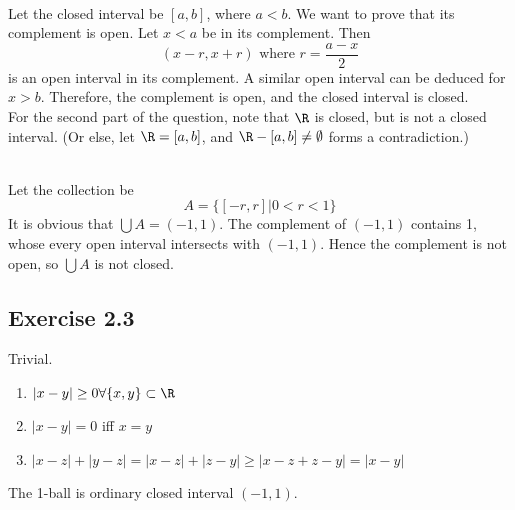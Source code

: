 
\begin{solution}
 \\Let the closed interval be $[a,b]$, where $a < b$. We want to prove that its complement is open. Let $x < a$ be in its complement. Then
 $$(x-r,x+r) \text{ where } r = \frac{a-x}{2}$$
 is an open interval in its complement. A similar open interval can be deduced for $x > b$. Therefore, the complement is open, and the closed interval is closed. \\
 For the second part of the question, note that $\R$ is closed, but is not a closed interval. (Or else, let $\R = [a,b]$, and $\R-[a,b] \neq \emptyset$ forms a contradiction.)
\end{solution}


\begin{solution}
 \\Let the collection be
 $$A = \{[-r,r]|0<r<1\}$$
 It is obvious that $\bigcup A = (-1,1)$. The complement of $(-1,1)$ contains 1, whose every open interval intersects with $(-1,1)$. Hence the complement is not open, so $\bigcup A$ is not closed.
\end{solution}

\subsection{Exercise 2.3}
\setcounter{question}{0}


\begin{solution}
Trivial.
\begin{enumerate}
 \item $|x-y| \geq 0 \forall \{x,y\} \subset \R$ \\
 \item $|x-y| = 0$ iff $x=y$ \\
 \item $|x-z|+|y-z|=|x-z|+|z-y| \geq |x-z+z-y| = |x-y|$ \\
 \end{enumerate}
 
 The 1-ball is ordinary closed interval $(-1,1)$.
\end{solution}

